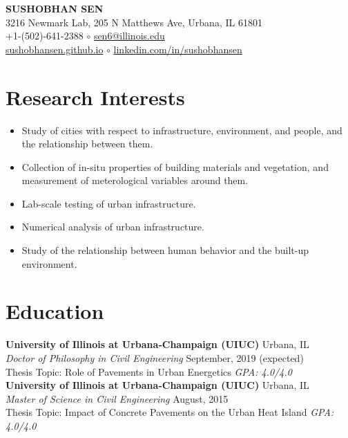 \documentclass[12pt]{article}
\begin{document}
 \sloppy %
\begin{center}
{\large \uppercase{\textbf{Sushobhan Sen}}} \\
3216 Newmark Lab, 205 N Matthews Ave, Urbana, IL 61801 \\
+1-(502)-641-2388 $\circ$ \href{mailto:sen6@illinois.edu}{sen6@illinois.edu} \\
\href{http://sushobhansen.github.io/}{sushobhansen.github.io} $\circ$ \href{http://linkedin.com/in/sushobhansen}{linkedin.com/in/sushobhansen}
\end{center} 

\hfill \break %
\section*{Research Interests}
\begin{itemize}
	\item Study of cities with respect to infrastructure, environment, and people, and the relationship between them.
	\item Collection of in-situ properties of building materials and vegetation, and measurement of meterological variables around them. 
	\item Lab-scale testing of urban infrastructure.
	\item Numerical analysis of urban infrastructure. 
	\item Study of the relationship between human behavior and the built-up environment.
\end{itemize}
 

\section*{Education}
\textbf{University of Illinois at Urbana-Champaign (UIUC)} \hfill Urbana, IL\\
\textit{Doctor of Philosophy in Civil Engineering} \hfill September, 2019 (expected)\\
Thesis Topic: Role of Pavements in Urban Energetics \hfill \textit{GPA: 4.0/4.0} \\

\textbf{University of Illinois at Urbana-Champaign (UIUC)} \hfill Urbana, IL\\
\textit{Master of Science in Civil Engineering} \hfill August, 2015\\
Thesis Topic: Impact of Concrete Pavements on the Urban Heat Island \hfill \textit{GPA: 4.0/4.0} \\
\end{document}
